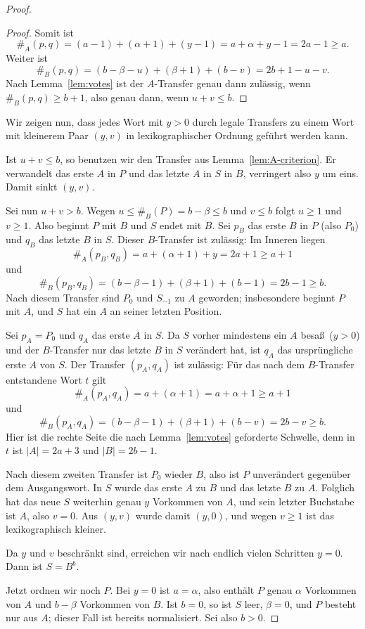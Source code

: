 \documentclass[11pt,a4paper]{article}
\begin{document}
\begin{proof}
\begin{proof}
Somit ist
\[
\#_A(p,q)=(a-1)+(\alpha+1)+(y-1)
=a+\alpha+y-1=2a-1\ge a.
\]
Weiter ist
\[
\#_B(p,q)=(b-\beta-u)+(\beta+1)+(b-v)
=2b+1-u-v.
\]
Nach Lemma~\ref{lem:votes} ist der $A$-Transfer genau dann zul\"assig,
wenn $\#_B(p,q)\ge b+1$, also genau dann, wenn $u+v\le b$.
\end{proof}

Wir zeigen nun, dass jedes Wort mit $y>0$ durch legale Transfers zu
einem Wort mit kleinerem Paar $(y,v)$ in lexikographischer Ordnung
gef\"uhrt werden kann.

Ist $u+v\le b$, so benutzen wir den Transfer aus
Lemma~\ref{lem:A-criterion}.  Er verwandelt das erste $A$ in $P$ und
das letzte $A$ in $S$ in $B$, verringert also $y$ um eins.  Damit
sinkt $(y,v)$.

Sei nun $u+v>b$.  Wegen $u\le \#_B(P)=b-\beta\le b$ und $v\le b$
folgt $u\ge1$ und $v\ge1$.  Also beginnt $P$ mit $B$ und $S$ endet
mit $B$.  Sei $p_B$ das erste $B$ in $P$ (also $P_0$) und $q_B$ das
letzte $B$ in $S$.  Dieser $B$-Transfer ist zul\"assig: Im Inneren
liegen
\[
\#_A(p_B,q_B)=a+(\alpha+1)+y=2a+1\ge a+1
\]
und
\[
\#_B(p_B,q_B)=(b-\beta-1)+(\beta+1)+(b-1)
=2b-1\ge b.
\]
Nach diesem Transfer sind $P_0$ und $S_{-1}$ zu $A$ geworden;
insbesondere beginnt $P$ mit $A$, und $S$ hat ein $A$ an seiner
letzten Position.

Sei $p_A=P_0$ und $q_A$ das erste $A$ in $S$.  Da $S$ vorher
mindestens ein $A$ besa\ss\ ($y>0$) und der $B$-Transfer nur das letzte
$B$ in $S$ ver\"andert hat, ist $q_A$ das urspr\"ungliche erste $A$ von
$S$.  Der Transfer $(p_A,q_A)$ ist zul\"assig: F\"ur das nach dem
$B$-Transfer entstandene Wort $t$ gilt
\[
\#_A(p_A,q_A)=a+(\alpha+1)=a+\alpha+1\ge a+1
\]
und
\[
\#_B(p_A,q_A)
=(b-\beta-1)+(\beta+1)+(b-v)
=2b-v\ge b.
\]
Hier ist die rechte Seite die nach Lemma~\ref{lem:votes} geforderte
Schwelle, denn in $t$ ist $|A|=2a+3$ und $|B|=2b-1$.

Nach diesem zweiten Transfer ist $P_0$ wieder $B$, also ist $P$
unver\"andert gegen\"uber dem Ausgangswort.  In $S$ wurde das erste $A$
zu $B$ und das letzte $B$ zu $A$.  Folglich hat das neue $S$ weiterhin
genau $y$ Vorkommen von $A$, und sein letzter Buchstabe ist $A$, also
$v=0$.  Aus $(y,v)$ wurde damit $(y,0)$, und wegen $v\ge1$ ist das
lexikographisch kleiner.

Da $y$ und $v$ beschr\"ankt sind, erreichen wir nach endlich vielen
Schritten $y=0$.  Dann ist $S=B^b$.

Jetzt ordnen wir noch $P$.  Bei $y=0$ ist $a=\alpha$, also enth\"alt
$P$ genau $\alpha$ Vorkommen von $A$ und $b-\beta$ Vorkommen von $B$.
Ist $b=0$, so ist $S$ leer, $\beta=0$, und $P$ besteht nur aus $A$;
dieser Fall ist bereits normalisiert.  Sei also $b>0$.


\end{proof}
\end{document}
